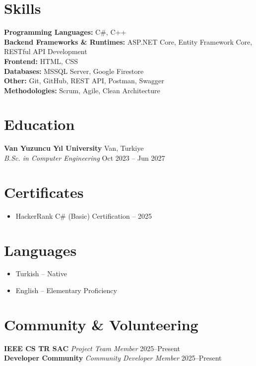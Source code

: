 \documentclass[10pt,a4paper]{extarticle}
\begin{document}
\section{Skills}
\textbf{Programming Languages:} C\#, C++ \\
\textbf{Backend Frameworks \& Runtimes:} ASP.NET Core, Entity Framework Core, RESTful API Development \\
\textbf{Frontend:} HTML, CSS \\
\textbf{Databases:} MSSQL Server, Google Firestore \\
\textbf{Other:} Git, GitHub, REST API, Postman, Swagger \\
\textbf{Methodologies:} Scrum, Agile, Clean Architecture

\section{Education}
\textbf{Van Yuzuncu Yıl University} \hfill Van, Turkiye\\
\textit{B.Sc. in Computer Engineering} \hfill Oct 2023 -- Jun 2027\\

\section{Certificates}
\begin{itemize}[leftmargin=*,noitemsep,topsep=0pt]
    \item HackerRank C\# (Basic) Certification – 2025
\end{itemize}

\section{Languages}
\begin{itemize}[leftmargin=*,noitemsep,topsep=0pt]
    \item Turkish – Native
    \item English – Elementary Proficiency
\end{itemize}

\section{Community \& Volunteering}
\textbf{IEEE CS TR SAC} \hfill \textit{Project Team Member} \hfill 2025--Present\\
\textbf{Developer Community} \hfill \textit{Community Developer Member} \hfill 2025--Present
\end{document}
